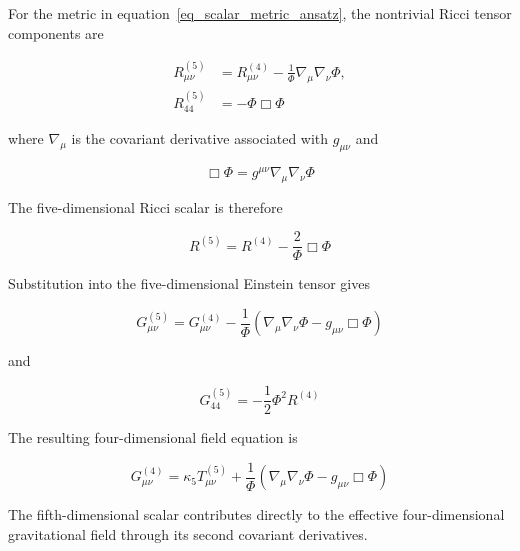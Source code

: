 \documentclass[pdflatex,sn-mathphys-num]{sn-jnl}%
\theoremstyle{thmstyleone}%
\theoremstyle{thmstyletwo}%
\theoremstyle{thmstylethree}%
\begin{document}
For the metric in equation~\eqref{eq_scalar_metric_ansatz}, the nontrivial Ricci tensor components are

\begin{align}
    R_{\mu\nu}^{(5)}
    &=
    R_{\mu\nu}^{(4)}
    -
    \frac{1}{\Phi}
    \nabla_\mu\nabla_\nu\Phi,
    \label{eq_ricci_4d_reduction}
    \\
    R_{44}^{(5)}
    &=
    -\Phi\Box\Phi
    \label{eq_ricci_44_reduction}
\end{align}

where $\nabla_\mu$ is the covariant derivative associated with $g_{\mu\nu}$ and

\begin{equation}
    \Box\Phi
    =
    g^{\mu\nu}\nabla_\mu\nabla_\nu\Phi
\end{equation}

The five-dimensional Ricci scalar is therefore

\begin{equation}
    R^{(5)}
    =
    R^{(4)}
    -
    \frac{2}{\Phi}\Box\Phi
    \label{eq_ricci_scalar_reduction}
\end{equation}

Substitution into the five-dimensional Einstein tensor gives

\begin{equation}
    \boxed{
    G_{\mu\nu}^{(5)}
    =
    G_{\mu\nu}^{(4)}
    -
    \frac{1}{\Phi}
    \left(
        \nabla_\mu\nabla_\nu\Phi
        -
        g_{\mu\nu}\Box\Phi
    \right)
    }
    \label{eq_einstein_mu_nu_reduction}
\end{equation}

and

\begin{equation}
    \boxed{
    G_{44}^{(5)}
    =
    -\frac{1}{2}\Phi^2R^{(4)}
    }
    \label{eq_einstein_44_reduction}
\end{equation}

The resulting four-dimensional field equation is

\begin{equation}
    \boxed{
    G_{\mu\nu}^{(4)}
    =
    \kappa_5T_{\mu\nu}^{(5)}
    +
    \frac{1}{\Phi}
    \left(
        \nabla_\mu\nabla_\nu\Phi
        -
        g_{\mu\nu}\Box\Phi
    \right)
    }
    \label{eq_effective_4d_field}
\end{equation}

The fifth-dimensional scalar contributes directly to the effective four-dimensional gravitational field through its second covariant derivatives.
\end{document}

